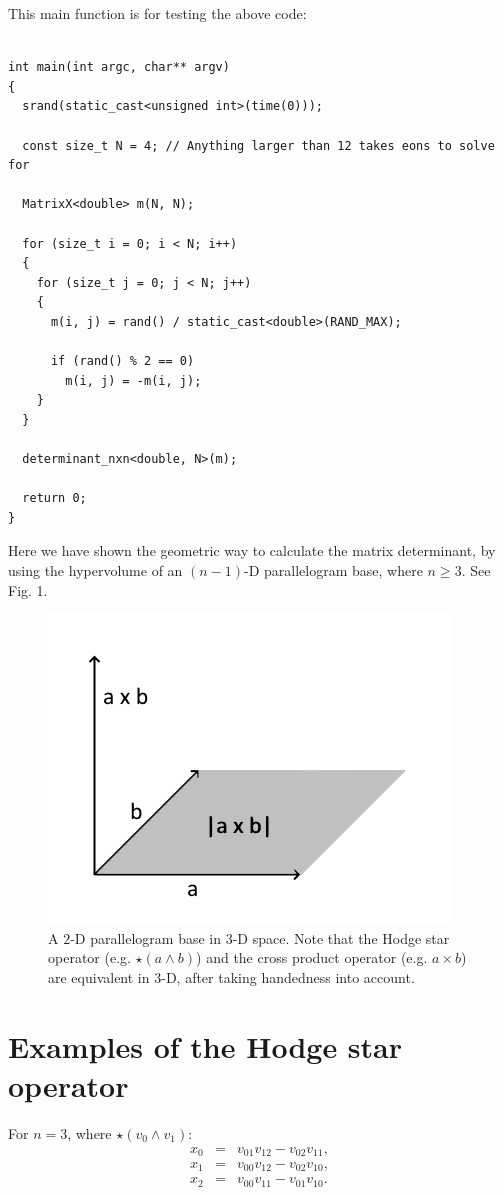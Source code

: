 \documentclass[12pt]{article}
\begin{document}
This main function is for testing the above code:
\begin{lstlisting}

int main(int argc, char** argv)
{
  srand(static_cast<unsigned int>(time(0)));

  const size_t N = 4; // Anything larger than 12 takes eons to solve for

  MatrixX<double> m(N, N);

  for (size_t i = 0; i < N; i++)
  {
    for (size_t j = 0; j < N; j++)
    {
      m(i, j) = rand() / static_cast<double>(RAND_MAX);

      if (rand() % 2 == 0)
        m(i, j) = -m(i, j);
    }
  }

  determinant_nxn<double, N>(m);

  return 0;
}
\end{lstlisting}
Here we have shown the geometric way to calculate the matrix determinant, by using the hypervolume of an $(n - 1)$-D parallelogram base, where $n \ge 3$. 
See Fig. 1.
\begin{figure} 
\centering
  \includegraphics[width = 3 in]{parallelogram.png}
  \caption{
A $2$-D parallelogram base in $3$-D space.
Note that the Hodge star operator (e.g. $\star(a \wedge b)$) and the cross product operator (e.g. $a \times b$) are equivalent in $3$-D, after taking handedness into account.
}
\end{figure}

\section{Examples of the Hodge star operator}
For $n = 3$, where $\star(v_{0} \wedge v_{1})$:
\begin{eqnarray}
x_{0} &=& v_{01} v_{12} - v_{02} v_{11},\\
x_{1} &=& v_{00} v_{12} - v_{02} v_{10},\\
x_{2} &=& v_{00} v_{11} - v_{01} v_{10}.
\end{eqnarray}
\end{document}
